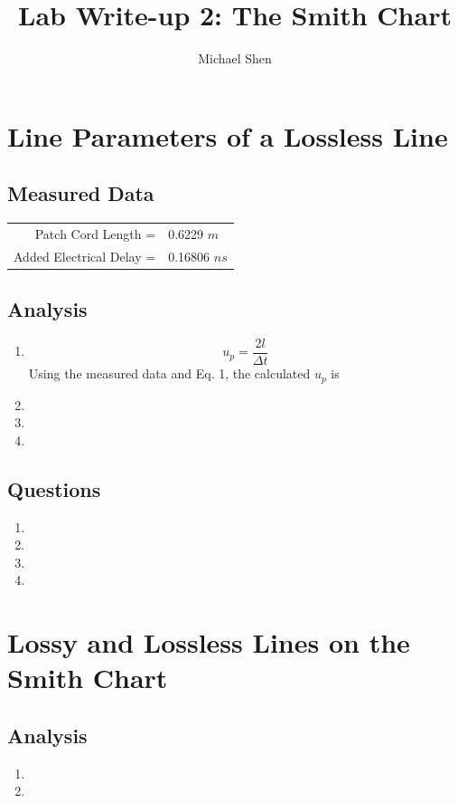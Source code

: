 \documentclass{article}
\begin{document}
\title{Lab Write-up 2: The Smith Chart}
\author{Michael Shen}
\maketitle

\section{Line Parameters of a Lossless Line}
\subsection{Measured Data}
\begin{table}[h]
\centering
	\begin{tabular}{rl}
	Patch Cord Length =  	  & 0.6229 $m$  \\
	Added Electrical Delay =  & 0.16806 $ns$      
	\end{tabular}
\end{table}
\subsection{Analysis}
\begin{enumerate}
	\item 
		\begin{equation}
			u_p = \dfrac{2l}{\Delta t}
		\end{equation}
		Using the measured data and Eq. 1, the calculated $u_p$ is 
	\item
	\item
	\item
\end{enumerate}
\subsection{Questions}
\begin{enumerate}
	\item
	\item
	\item
	\item
\end{enumerate}

\section{Lossy and Lossless Lines on the Smith Chart}
\subsection{Analysis}
\begin{enumerate}
	\item
	\item
\end{enumerate}
\end{document}
